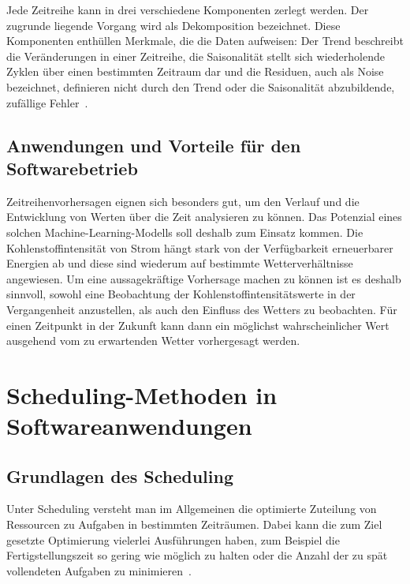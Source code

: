 Jede Zeitreihe kann in drei verschiedene Komponenten zerlegt werden.
Der zugrunde liegende Vorgang wird als Dekomposition bezeichnet.
Diese Komponenten enthüllen Merkmale, die die Daten aufweisen:
Der Trend beschreibt die Veränderungen in einer Zeitreihe, die Saisonalität stellt sich wiederholende Zyklen über einen bestimmten Zeitraum dar und die Residuen, auch als Noise bezeichnet, definieren nicht durch den Trend oder die Saisonalität abzubildende, zufällige Fehler~\cite{Peixeiro.2022}.

\subsection{Anwendungen und Vorteile für den Softwarebetrieb}
Zeitreihenvorhersagen eignen sich besonders gut, um den Verlauf und die Entwicklung von Werten über die Zeit analysieren zu können.
Das Potenzial eines solchen Machine-Learning-Modells soll deshalb zum Einsatz kommen.
Die Kohlenstoffintensität von Strom hängt stark von der Verfügbarkeit erneuerbarer Energien ab und diese sind wiederum auf bestimmte Wetterverhältnisse angewiesen.
Um eine aussagekräftige Vorhersage machen zu können ist es deshalb sinnvoll, sowohl eine Beobachtung der Kohlenstoffintensitätswerte in der Vergangenheit anzustellen, als auch den Einfluss des Wetters zu beobachten.
Für einen Zeitpunkt in der Zukunft kann dann ein möglichst wahrscheinlicher Wert ausgehend vom zu erwartenden Wetter vorhergesagt werden.

\section{Scheduling-Methoden in Softwareanwendungen}
\subsection{Grundlagen des Scheduling}
Unter Scheduling versteht man im Allgemeinen die optimierte Zuteilung von Ressourcen zu Aufgaben in bestimmten Zeiträumen.
Dabei kann die zum Ziel gesetzte Optimierung vielerlei Ausführungen haben, zum Beispiel die Fertigstellungszeit so gering wie möglich zu halten oder die Anzahl der zu spät vollendeten Aufgaben zu minimieren~\cite{Gawiejnowicz.2020}.

